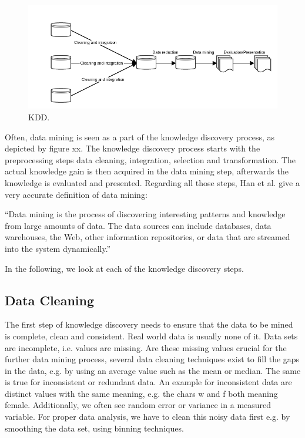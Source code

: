 \begin{figure}[htsb]
  \centering
  \includegraphics[scale=0.5]{figures/kdd}
  \caption[kdd]{KDD.}\label{fig:kdd}
\end{figure}

Often, data mining is seen as a part of the knowledge discovery process, as depicted by figure xx. The knowledge discovery process starts with the preprocessing steps data cleaning, integration, selection and transformation. The actual knowledge gain is then acquired in the data mining step, afterwards the knowledge is evaluated and presented. 
Regarding all those steps, Han et al. give a very accurate definition of data mining: 

“Data mining is the process of discovering interesting patterns and knowledge from large amounts of data. The data sources can include databases, data warehouses, the Web, other information repositories, or data that are streamed into the system dynamically.”
 
 In the following, we look at each of the knowledge discovery steps.




\subsection{Data Cleaning}

The first step of knowledge discovery needs to ensure that the data to be mined is complete, clean and consistent. Real world data is usually none of it. Data sets are incomplete, i.e. values are missing. Are these missing values crucial for the further data mining process, several data cleaning techniques exist to fill the gaps in the data, e.g. by using an average value such as the mean or median.
The same is true for inconsistent or redundant data. An example for inconsistent data are distinct values with the same meaning, e.g. the chars w and f both meaning female. Additionally, we often see random error or variance in a measured variable. For proper data analysis, we have to clean this noisy data first e.g. by smoothing the data set, using binning techniques.



